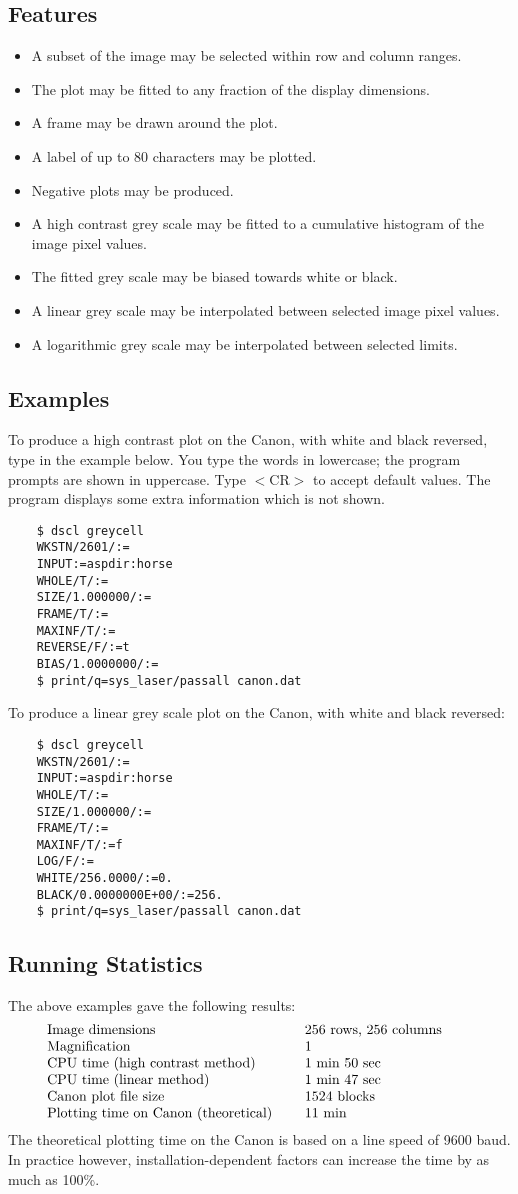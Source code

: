 \subsection {Features}
\begin{itemize}
\item A subset of the image may be selected within row and column ranges.
\item The plot may be fitted to any fraction of the display dimensions.
\item A frame may be drawn around the plot.
\item A label of up to 80 characters may be plotted.
\item Negative plots may be produced.
\item A high contrast grey scale may be fitted to a cumulative histogram of
 the image pixel values.
\item The fitted grey scale may be biased towards white or black.
\item A linear grey scale may be interpolated between selected image pixel
 values.
\item A logarithmic grey scale may be interpolated between selected limits.
\end{itemize}
\subsection {Examples}
To produce a high contrast plot on the Canon, with white and black reversed,
type in the example below.
You type the words in lowercase; the program prompts are shown in uppercase.
Type $<$CR$>$ to accept default values.
The program displays some extra information which is not shown.
\begin{verbatim}
    $ dscl greycell
    WKSTN/2601/:=
    INPUT:=aspdir:horse
    WHOLE/T/:=
    SIZE/1.000000/:=
    FRAME/T/:=
    MAXINF/T/:=
    REVERSE/F/:=t
    BIAS/1.0000000/:=
    $ print/q=sys_laser/passall canon.dat
\end{verbatim}
To produce a linear grey scale plot on the Canon, with white and black reversed:
\begin{verbatim}
    $ dscl greycell
    WKSTN/2601/:=
    INPUT:=aspdir:horse
    WHOLE/T/:=
    SIZE/1.000000/:=
    FRAME/T/:=
    MAXINF/T/:=f
    LOG/F/:=
    WHITE/256.0000/:=0.
    BLACK/0.0000000E+00/:=256.
    $ print/q=sys_laser/passall canon.dat
\end{verbatim}
\subsection {Running Statistics}
The above examples gave the following results:
$$\vbox{
\tabskip=2em
\halign to \hsize{#\hfil & #\hfil\cr
Image dimensions & 256 rows, 256 columns\cr
Magnification & 1\cr
CPU time (high contrast method) & 1 min 50 sec\cr
CPU time (linear method) & 1 min 47 sec\cr
Canon plot file size & 1524 blocks\cr
Plotting time on Canon (theoretical) & 11 min\cr
}}$$
The theoretical plotting time on the Canon is based on a line speed of 9600
baud. In practice however, installation-dependent factors can increase the time
by as much as 100\%.

